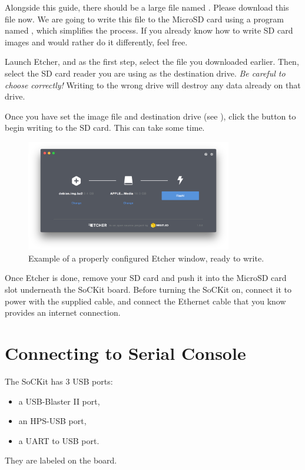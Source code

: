 \documentclass{sockitguide}
\begin{document}
Alongside this guide, there should be a large file named
. Please download this file now. We are
going to write this file to the MicroSD card using a program named
, which simplifies the process. If
you already know how to write SD card images and would rather do it
differently, feel free.

Launch Etcher, and as the first step, select the
 file you downloaded earlier. Then, select the
SD card reader you are using as the destination drive. \textit{Be
  careful to choose correctly!} Writing to the wrong drive will
destroy any data already on that drive.

Once you have set the image file and destination drive (see
), click the  button to begin writing
to the SD card. This can take some time.

\begin{figure}
  \includegraphics[width=9cm]{figures/etcher.png}
  \caption{Example of a properly configured Etcher window, ready to write.}
  \label{fig:etcher}
\end{figure}

Once Etcher is done, remove your SD card and push it into the MicroSD
card slot underneath the SoCKit board. Before turning the SoCKit on,
connect it to power with the supplied cable, and connect the Ethernet
cable that you know provides an internet connection.

\section{Connecting to Serial Console}

The SoCKit has \num{3} USB ports:
\begin{itemize}
\item a USB-Blaster II port,
\item an HPS-USB port,
\item a UART to USB port.
\end{itemize}
They are labeled on the board.
\end{document}
